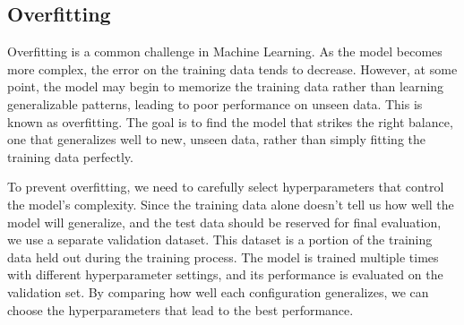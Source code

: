 \subsection{Overfitting}
Overfitting is a common challenge in Machine Learning. 
As the model becomes more complex, the error on the training data tends to decrease. 
However, at some point, the model may begin to memorize the training data rather than learning generalizable patterns, leading to poor performance on unseen data. 
This is known as overfitting. 
The goal is to find the model that strikes the right balance, one that generalizes well to new, unseen data, rather than simply fitting the training data perfectly.

To prevent overfitting, we need to carefully select hyperparameters that control the model's complexity.
Since the training data alone doesn't tell us how well the model will generalize, and the test data should be reserved for final evaluation, we use a separate validation dataset. 
This dataset is a portion of the training data held out during the training process. 
The model is trained multiple times with different hyperparameter settings, and its performance is evaluated on the validation set. 
By comparing how well each configuration generalizes, we can choose the hyperparameters that lead to the best performance.
